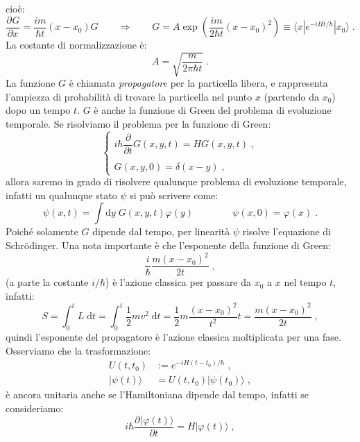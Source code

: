 \documentclass[12pt,a4paper]{report}
\theoremstyle{definition}
\newcommand{\pdev}[3][]{\frac{\partial^{#1} #2}{\partial #3^{#1}}}
\numberwithin{equation}{section}
\newcommand{\diff}[1][]{\mathrm{d}#1}
\newcommand{\bra}{\langle}
\newcommand{\ket}{\rangle}
\newcommand{\Sch}{Schrödinger}
\begin{document}
cioè:
\begin{equation}
\pdev{G}{x}=\frac{im}{\hbar t}(x-x_0)G \qquad \Longrightarrow \qquad G=A\exp\left(\frac{im}{2\hbar t}(x-x_0)^2\right)\equiv \bra x|e^{-iHt/\hbar}|x_0\ket\;.
\end{equation}
La costante di normalizzazione è:
\begin{equation}
A=\sqrt{\frac{m}{2\pi\hbar t}}\;.
\end{equation}
La funzione $G$ è chiamata \textit{propagatore} per la particella libera, e rappresenta l'ampiezza di probabilità di trovare la particella nel punto $x$ (partendo da $x_0$) dopo un tempo $t$. $G$ è anche la funzione di Green del problema di evoluzione temporale. Se risolviamo il problema per la funzione di Green:
\begin{equation}
\begin{cases}
i\hbar \dfrac{\partial}{\partial t}G(x,y,t)=HG(x,y,t)\;, \\
\\
G(x,y,0)=\delta(x-y)\;,
\end{cases}
\end{equation}
allora saremo in grado di risolvere qualunque problema di evoluzione temporale, infatti un qualunque stato $\psi$ si può scrivere come:
\begin{equation}
\psi(x,t)=\int\diff{y}\; G(x,y,t)\varphi(y) \qquad\qquad \psi(x,0)=\varphi(x)\;.
\end{equation}
Poiché solamente $G$ dipende dal tempo, per linearità $\psi$ risolve l'equazione di \Sch. Una nota importante è che l'esponente della funzione di Green:
\begin{equation}
\frac{i}{\hbar}\frac{m(x-x_0)^2}{2t}\;,
\end{equation}
(a parte la costante $i/\hbar$) è l'azione classica per passare da $x_0$ a $x$ nel tempo $t$, infatti:
\begin{equation}
S=\int_0^t L\;\diff{t}=\int_0^t \frac{1}{2}mv^2\;\diff{t}=\frac{1}{2}m\frac{(x-x_0)^2}{t^2}t=\frac{m(x-x_0)^2}{2t}\;,
\end{equation}
quindi l'esponente del propagatore è l'azione classica moltiplicata per una fase. \\
Osserviamo che la trasformazione:
\begin{align*}
U(t,t_0) &:=e^{-iH(t-t_0)/\hbar}\;, \\
|\psi(t)\ket &= U(t,t_0)|\psi(t_0)\ket\;,
\end{align*}
è ancora unitaria anche se l'Hamiltoniana dipende dal tempo, infatti se consideriamo:
\begin{equation}
i\hbar\pdev{|\varphi(t)\ket}{t}=H|\varphi(t)\ket\;,
\end{equation}
\end{document}

